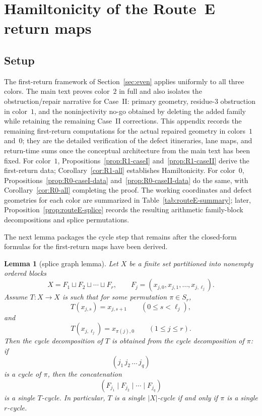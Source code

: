 \documentclass[11pt]{article}
\newtheorem{lemma}{Lemma}
\begin{document}
\section{Hamiltonicity of the Route~E return maps}\label{app:routeE-cycle}

\subsection{Setup}

The first-return framework of Section~\ref{sec:even} applies uniformly to all three colors.
The main text proves color~$2$ in full and also isolates the obstruction/repair narrative for Case~II: primary geometry, residue-$3$ obstruction in color~$1$, and the noninjectivity no-go obtained by deleting the added family while retaining the remaining Case~II corrections.
This appendix records the remaining first-return computations for the actual repaired geometry in colors~$1$ and~$0$; they are the detailed verification of the defect itineraries, lane maps, and return-time sums once the conceptual architecture from the main text has been fixed.
For color~$1$, Propositions~\ref{prop:R1-caseI} and~\ref{prop:R1-caseII} derive the first-return data; Corollary~\ref{cor:R1-all} establishes Hamiltonicity.
For color~$0$, Propositions~\ref{prop:R0-caseI-data} and~\ref{prop:R0-caseII-data} do the same, with Corollary~\ref{cor:R0-all} completing the proof.
The working coordinates and defect geometries for each color are summarized in Table~\ref{tab:routeE-summary}; later, Proposition~\ref{prop:routeE-splice} records the resulting arithmetic family-block decompositions and splice permutations.

The next lemma packages the cycle step that remains after the closed-form formulas for the first-return maps have been derived.


\begin{lemma}[splice graph lemma]\label{lem:splice-graph}
Let $X$ be a finite set partitioned into nonempty ordered blocks
\[
X=F_1\sqcup F_2\sqcup \cdots \sqcup F_r,
\qquad
F_j=(x_{j,0},x_{j,1},\dots,x_{j,\ell_j}).
\]
Assume $T:X\to X$ is such that for some permutation $\pi\in S_r$,
\[
T(x_{j,s})=x_{j,s+1}\qquad (0\le s<\ell_j),
\]
and
\[
T(x_{j,\ell_j})=x_{\pi(j),0}\qquad (1\le j\le r).
\]
Then the cycle decomposition of $T$ is obtained from the cycle decomposition of $\pi$: if
\[
(j_1\,j_2\,\dots\,j_q)
\]
is a cycle of $\pi$, then the concatenation
\[
(F_{j_1}\mid F_{j_2}\mid \cdots \mid F_{j_q})
\]
is a single $T$-cycle.
In particular, $T$ is a single $|X|$-cycle if and only if $\pi$ is a single $r$-cycle.
\end{lemma}
\end{document}

